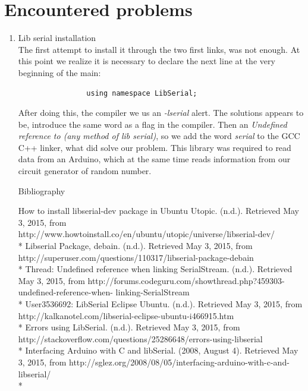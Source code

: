 \documentclass[twocolumn]{IEEEtran}
\begin{document}
\section{Encountered problems}
\begin{enumerate}
	\item Lib serial installation\\
    The first attempt to install it through the two first links, was not enough. At this 
    point we realize it is necessary to declare the next line at the very beginning of 
    the main:
    \begin{center}
 	   \begin{verbatim}
			    using namespace LibSerial;
		\end{verbatim}

	\end{center}
 	After doing this, the compiler we us an \textit{-lserial} alert. The solutions 
    appears to be, introduce the same word as a flag in the compiler. Then an \textit{ 
    Undefined reference to (any method of lib serial)}, so we add the word 
    \textit{serial} to the GCC C++ linker, what did solve our problem. This library was 
    required to read data from an Arduino, which at the same time reads information from 
    our circuit generator of random number.\\

	\begin{center}
    Bibliography
    \end{center}
	How to install libserial-dev package in Ubuntu Utopic. (n.d.). Retrieved May 3, 
    2015, from http://www.howtoinstall.co/en/ubuntu/utopic/universe/libserial-dev/ \\*
    Libserial Package, debain. (n.d.). Retrieved May 3, 2015, from
    http://superuser.com/questions/110317/libserial-package-debain  \\*
    Thread: Undefined reference when linking SerialStream. (n.d.). Retrieved May 3, 
    2015, from http://forums.codeguru.com/showthread.php?459303-undefined-reference-when-
    linking-SerialStream \\*
    User3536692: LibSerial Eclipse Ubuntu. (n.d.). Retrieved May 3, 2015, from 
    http://kalkanotel.com/libserial-eclipse-ubuntu-i466915.htm \\*
    Errors using LibSerial. (n.d.). Retrieved May 3, 2015, from 
    http://stackoverflow.com/questions/25286648/errors-using-libserial \\*
    Interfacing Arduino with C and libSerial. (2008, August 4). Retrieved May 3, 
    2015, from http://sglez.org/2008/08/05/interfacing-arduino-with-c-and-libserial/ \\*
    

\end{enumerate}
\end{document}
